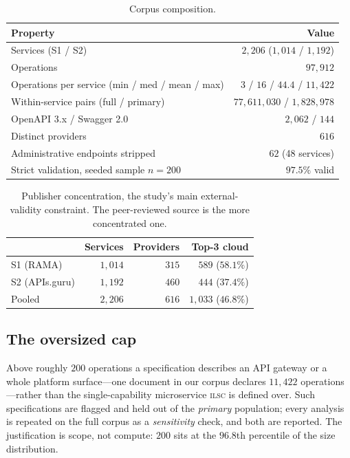 \documentclass[journal]{IEEEtran}
\newcommand{\ilsc}{\textsc{ilsc}}
\begin{document}
\begin{table}[!t]
\caption{Corpus composition.}
\label{tab:composition}
\centering
\footnotesize
\begin{tabular}{@{}lr@{}}
\toprule
\textbf{Property} & \textbf{Value} \\
\midrule
Services (S1 / S2) & $2{,}206$ ($1{,}014$ / $1{,}192$) \\
Operations & $97{,}912$ \\
Operations per service (min / med / mean / max) & $3$ / $16$ / $44.4$ / $11{,}422$ \\
Within-service pairs (full / primary) & $77{,}611{,}030$ / $1{,}828{,}978$ \\
OpenAPI 3.x / Swagger 2.0 & $2{,}062$ / $144$ \\
Distinct providers & $616$ \\
Administrative endpoints stripped & $62$ (48 services) \\
Strict validation, seeded sample $n{=}200$ & $97.5\%$ valid \\
\bottomrule
\end{tabular}
\end{table}

\begin{table}[!t]
\caption{Publisher concentration, the study's main external-validity
constraint. The peer-reviewed source is the more concentrated one.}
\label{tab:concentration}
\centering
\footnotesize
\begin{tabular}{@{}lrrr@{}}
\toprule
& \textbf{Services} & \textbf{Providers} & \textbf{Top-3 cloud} \\
\midrule
S1 (RAMA) & $1{,}014$ & $315$ & $589$ ($58.1\%$) \\
S2 (APIs.guru) & $1{,}192$ & $460$ & $444$ ($37.4\%$) \\
Pooled & $2{,}206$ & $616$ & $1{,}033$ ($46.8\%$) \\
\bottomrule
\end{tabular}
\end{table}

\subsection{The oversized cap}
Above roughly $200$ operations a specification describes an API gateway or a
whole platform surface---one document in our corpus declares $11{,}422$
operations---rather than the single-capability microservice \ilsc{} is defined
over. Such specifications are flagged and held out of the \emph{primary}
population; every analysis is repeated on the full corpus as a
\emph{sensitivity} check, and both are reported. The justification is scope, not
compute: $200$ sits at the $96.8$th percentile of the size distribution.
\end{document}
